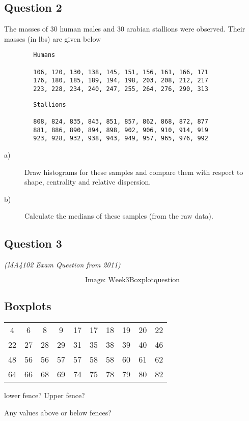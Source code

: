 


\subsection*{Question 2}
The masses of 30 human males and 30 arabian stallions were observed. Their masses (in lbs) are given below
{
	\large
	\begin{framed}
		\begin{verbatim}
		Humans
		
		106, 120, 130, 138, 145, 151, 156, 161, 166, 171
		176, 180, 185, 189, 194, 198, 203, 208, 212, 217
		223, 228, 234, 240, 247, 255, 264, 276, 290, 313
		\end{verbatim}
	\end{framed}
}
\newpage
{
	\large
	\begin{framed}
		\begin{verbatim}
		Stallions
		
		808, 824, 835, 843, 851, 857, 862, 868, 872, 877
		881, 886, 890, 894, 898, 902, 906, 910, 914, 919
		923, 928, 932, 938, 943, 949, 957, 965, 976, 992
		\end{verbatim}
	\end{framed}
}
\begin{description}
	\item[a)]	Draw histograms for these samples and compare them with respect to shape, centrality and relative dispersion. 
	\item[b)]	Calculate the medians of these samples (from the raw data).
	
\end{description}
\subsection*{Question 3}
\textit{(MA4102 Exam Question from 2011)}

\[\mbox{Image: Week3Boxplotquestion}\]

\subsection{Boxplots}
\begin{center}
	\begin{tabular}{cccccccccc}
		\hline 
		4 & 6 & 8 & 9 & 17 & 17 & 18 & 19 & 20 & 22 \\ 
		
		22 & 27 & 28 & 29 & 31 & 35 & 38 & 39 & 40 & 46 \\ 	
		48 & 56 & 56 & 57 & 57 & 58 & 58 & 60 & 61 & 62 \\ 	
		64 & 66 & 68 & 69 & 74 & 75 & 78 & 79 & 80 & 82 \\ \hline
		
	\end{tabular} 
\end{center}


lower fence?
Upper fence?

Any values above or below fences?






 
